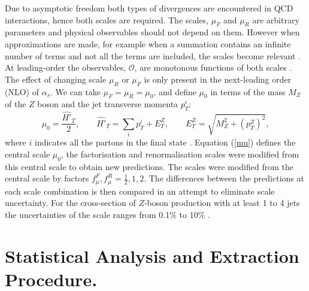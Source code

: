 \documentclass[12pt, onecolumn]{revtex4}    %
\begin{document}
Due to asymptotic freedom both types of divergences are encountered in QCD interactions, hence both scales are required. The scales, ${\mu_F}$ and ${\mu_R}$ are arbitrary parameters and physical observables should not depend on them.  However when approximations are made, for example when a summation contains an infinite number of terms and not all the terms are included, the scales become relevant \cite{PHD}. At leading-order the observables, ${\mathcal{O}}$, are monotonous functions of both scales \cite{BOOK}. The effect of changing scale ${\mu_R}$ or ${\mu_F}$ is only present in the next-leading order (NLO) of ${\alpha _s}$. We can take ${\mu_F = \mu_R = \mu_0}$, and define ${\mu_0}$ in terms of the mass ${M_Z}$ of the ${Z}$ boson and the jet transverse momenta ${p_T^i}$: \begin{equation} \label{mu} \mu_0 = \dfrac{\hat{H'}_T}{2}, \qquad \hat{H'}_T = \sum_i p_T^i + E_T^Z, \qquad E_T^Z = \sqrt{M_Z^2 + (p_T^Z)^2}, \end{equation} where ${i}$ indicates all the partons in the final state \cite{DMP}. Equation (\ref{mu}) defines the central scale ${\mu_0}$, the factorisation and renormalisation scales were modified from this central scale to obtain new predictions. The scales were modified from the central scale by factors ${f_\mu^F,f_\mu^R = \frac{1}{2},1,2}$. The differences between the predictions at each scale combination is then compared in an attempt to eliminate scale uncertainty. For the cross-section of ${Z}$-boson production with at least 1 to 4 jets the uncertainties of the scale ranges from 0.1\% to 10\% \cite{HEPP}. 
 
 

\section{Statistical Analysis and Extraction Procedure.} \label{stats}
\end{document}

